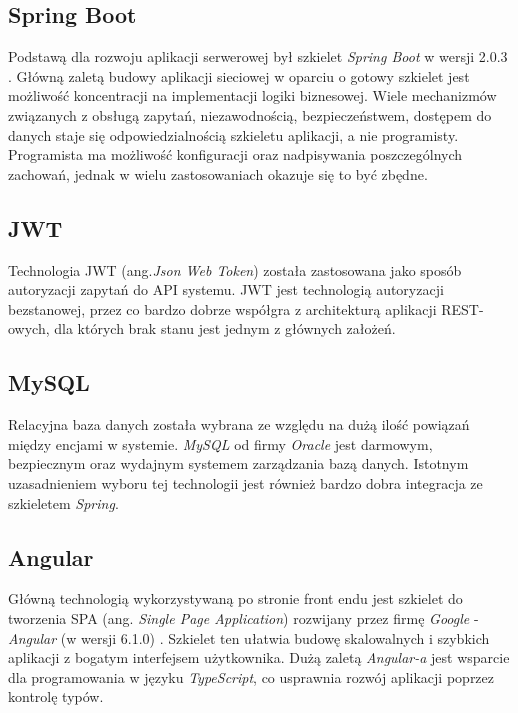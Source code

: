 \subsection{Spring Boot}

Podstawą dla rozwoju aplikacji serwerowej był szkielet \textit{Spring Boot} w wersji 2.0.3 \cite{springboot}. Główną zaletą budowy aplikacji sieciowej w oparciu o gotowy szkielet jest możliwość koncentracji na implementacji logiki biznesowej. Wiele mechanizmów związanych z obsługą zapytań, niezawodnością, bezpieczeństwem, dostępem do danych staje się odpowiedzialnością szkieletu aplikacji, a nie programisty. Programista ma możliwość konfiguracji oraz nadpisywania poszczególnych zachowań, jednak w wielu zastosowaniach okazuje się to być zbędne.


\subsection{JWT}

Technologia JWT (ang.\textit{Json Web Token}) została zastosowana jako sposób autoryzacji zapytań do API systemu. JWT jest technologią autoryzacji bezstanowej, przez co bardzo dobrze współgra z architekturą aplikacji REST-owych, dla których brak stanu jest jednym z głównych założeń.

\subsection{MySQL} 

Relacyjna baza danych została wybrana ze względu na dużą ilość powiązań między encjami w systemie. \textit{MySQL} od firmy \textit{Oracle} jest darmowym, bezpiecznym oraz wydajnym systemem zarządzania bazą danych.  Istotnym uzasadnieniem wyboru tej technologii jest również bardzo dobra integracja ze szkieletem \textit{Spring}.

\subsection{Angular}

Główną technologią wykorzystywaną po stronie front endu jest szkielet do tworzenia SPA (ang. \textit{Single Page Application}) rozwijany przez firmę \textit{Google} - \textit{Angular} (w wersji 6.1.0) \cite{angular}. Szkielet ten ułatwia budowę skalowalnych i szybkich aplikacji z bogatym interfejsem użytkownika. Dużą zaletą \textit{Angular-a} jest wsparcie dla programowania w języku \textit{TypeScript}, co usprawnia rozwój aplikacji poprzez kontrolę typów.

